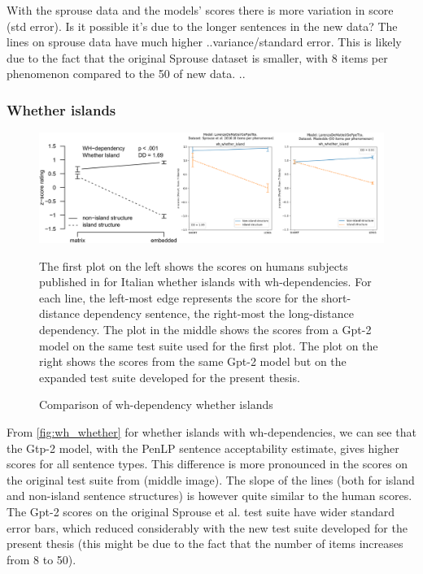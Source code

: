 With the sprouse data and the models' scores there is more variation in score (std error). Is it possible it's due to the longer sentences in the new data?
The lines on sprouse data have much higher ..variance/standard error. This is likely due to the fact that the original Sprouse dataset is smaller, with 8 items per phenomenon compared to the 50 of new data. ..


\subsubsection{Whether islands}

\begin{figure}
	\centering
	\includegraphics[width=1\textwidth]{images/Chapter1/combined_wh-whether.png} %
	\caption{Comparison of wh-dependency whether islands} 
	\label{fig:wh_whether} %
	\medskip
	\small
	The first plot on the left shows the scores on humans subjects published in \citet{sprouse2016experimental} for Italian whether islands with wh-dependencies. For each line, the left-most edge represents the score for the short-distance dependency sentence, the right-most the long-distance dependency. The plot in the middle shows the scores from a Gpt-2 model \citep{de2020geppetto} on the same test suite used for the first plot. The plot on the right shows the scores from the same Gpt-2 model but on the expanded test suite developed for the present thesis.
\end{figure}

From \autoref{fig:wh_whether} for whether islands with wh-dependencies, we can see that the Gtp-2 model, with the PenLP sentence acceptability estimate, gives higher scores for all sentence types. This difference is more pronounced in the scores on the original test suite from \citet{sprouse2016experimental} (middle image). The slope of the lines (both for island and non-island sentence structures) is however quite similar to the human scores. The Gpt-2 scores on the original Sprouse et al. test suite have wider standard error bars, which reduced considerably with the new test suite developed for the present thesis (this might be due to the fact that the number of items increases from 8 to 50).

